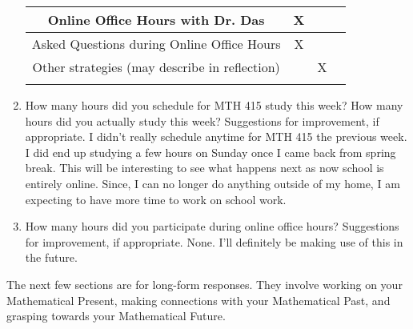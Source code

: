 \documentclass[10pt]{article}
\begin{document}
\begin{enumerate}
\begin{tabular}{|c|c|c|c|}
		Online Office Hours with Dr. Das &X&&\\
		\hline		
		Asked Questions during Online Office Hours &X&&\\
		\hline
		\hline
		
		Other strategies (may describe in reflection) &&X&\\
		&&&\\
		\hline
		
			
	\end{tabular}

\item How many hours did you schedule for MTH 415 study this week? How many hours did you actually study this week? Suggestions for improvement, if appropriate.
\vfill
I didn't really schedule anytime for MTH 415 the previous week. I did end up studying a few hours on Sunday once I came back from spring break. This will be interesting to see what happens next as now school is entirely online. Since, I can no longer do anything outside of my home, I am expecting to have more time to work on school work.
\item How many hours did you participate during online office hours? Suggestions for improvement, if appropriate.
\vfill
None. I'll definitely be making use of this in the future.

\end{enumerate}

\newpage
The next few sections are for long-form responses. They involve working on your Mathematical Present, making connections with your Mathematical Past, and grasping towards your Mathematical Future.
\end{document}
